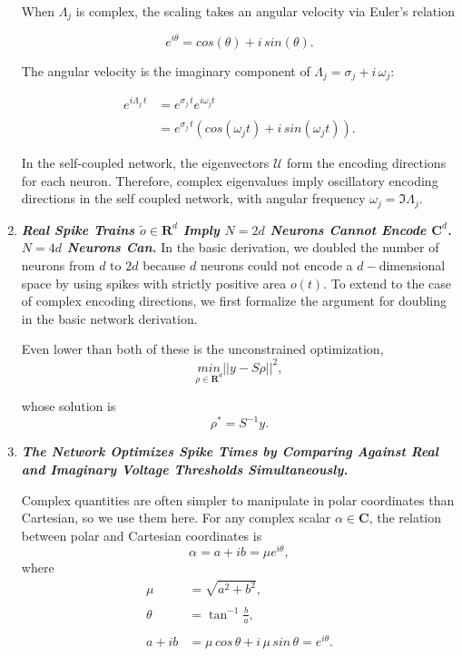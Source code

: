 \begin{enumerate}
When $\Lambda_j$ is complex, the scaling takes an angular velocity via Euler's relation

$$
e^{i \theta} = cos(\theta) + i \, sin(\theta).
$$

The angular velocity is the imaginary component of $\Lambda_j = \sigma_j + i \, \omega_j$: 

\begin{align*}
e^{i \Lambda_j \, t} 
&=
e^{\sigma_j \, t} e^{i \omega_j t}
\\
\\
&=
e^{\sigma_j \, t} \left(cos(\omega_j t) + i \, sin(\omega_j t)\right).
\end{align*}

In the self-coupled network, the eigenvectors $\mathcal{U}$ form the encoding directions for each neuron. Therefore, complex eigenvalues imply oscillatory encoding directions in the self coupled network, with angular frequency $\omega_j = \Im \Lambda_j$. 

 

\item \textbf{\textit{Real Spike Trains $\tilde{o} \in \mathbf{R}^d$ Imply $N = 2d$ Neurons Cannot Encode $\mathbf{C}^d$. $N = 4d$ Neurons Can.}} In the basic derivation, we doubled the number of neurons from $d$ to $2d$ because $d$ neurons could not encode a $d-$dimensional space by using spikes with strictly positive area $o(t)$. To extend to the case of complex encoding directions, we first formalize the argument for doubling in the basic network derivation. 









 Even lower than both of these is the unconstrained optimization, 
$$
\underset{\rho \in \mathbf{R}^{d}}{min} ||y - S \rho ||^2, 
$$

whose solution is 
$$
\rho^* = S^{-1}y. 
$$


\item\textbf{\textit{The Network Optimizes Spike Times by Comparing Against Real and Imaginary Voltage Thresholds Simultaneously.}}



Complex quantities are often simpler to manipulate in polar coordinates than Cartesian, so we use them here. For any complex scalar $\alpha \in \mathbf{C}$, the relation between polar and Cartesian coordinates is
$$
\alpha = a + i b = \mu e^{i \theta}, 
$$
where
\begin{align*}
\mu &= \sqrt{a^2 + b^2}, 
\\
\\
\theta &= \tan^{-1}\frac{b}{a},
\\
\\
a + ib &= \mu \, cos \,\theta + i \, \mu \,  sin \, \theta = e^{i\theta}.
\end{align*}


\end{enumerate}
